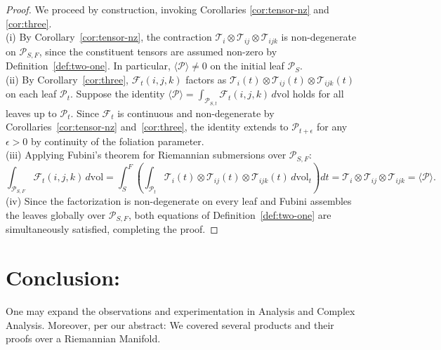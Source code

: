 \documentclass[10pt]{article}
\theoremstyle{plain}
\theoremstyle{definition}
\theoremstyle{remark}
\begin{document}
\begin{proof}
\label{proof:construc}
We proceed by construction, invoking Corollaries \ref{cor:tensor-nz} and \ref{cor:three}.\\
(i) By Corollary~\ref{cor:tensor-nz}, the contraction $\mathcal{T}_i \otimes \mathcal{T}_{ij} \otimes \mathcal{T}_{ijk}$ is non-degenerate on $\mathcal{P}_{S,F}$, since the constituent tensors are assumed non-zero by Definition~\ref{def:two-one}. In particular, $\langle \mathcal{P} \rangle \neq 0$ on the initial leaf $\mathcal{P}_S$.\\
(ii) By Corollary~\ref{cor:three}, $\mathcal{F}_t(i,j,k)$ factors as $\mathcal{T}_i(t) \otimes \mathcal{T}_{ij}(t) \otimes \mathcal{T}_{ijk}(t)$ on each leaf $\mathcal{P}_t$. Suppose the identity $\langle \mathcal{P} \rangle = \int_{\mathcal{P}_{S,t}} \mathcal{F}_t(i,j,k)\,d\mathrm{vol}$ holds for all leaves up to $\mathcal{P}_t$. Since $\mathcal{F}_t$ is continuous and non-degenerate by Corollaries~\ref{cor:tensor-nz} and~\ref{cor:three}, the identity extends to $\mathcal{P}_{t+\epsilon}$ for any $\epsilon > 0$ by continuity of the foliation parameter.\\
(iii) Applying Fubini's theorem for Riemannian submersions over $\mathcal{P}_{S,F}$:
\begin{equation}
  \int_{\mathcal{P}_{S,F}} \mathcal{F}_t(i,j,k)\,d\mathrm{vol}
  = \int_{S}^{F} \left(\int_{\mathcal{P}_t} \mathcal{T}_i(t) \otimes \mathcal{T}_{ij}(t) \otimes \mathcal{T}_{ijk}(t)\,d\mathrm{vol}_t\right) dt
  = \mathcal{T}_i \otimes \mathcal{T}_{ij} \otimes \mathcal{T}_{ijk}
  = \langle \mathcal{P} \rangle.
\end{equation}
(iv) Since the factorization is non-degenerate on every leaf and Fubini assembles the leaves globally over $\mathcal{P}_{S,F}$, both equations of Definition~\ref{def:two-one} are simultaneously satisfied, completing the proof.
\end{proof}

\section{Conclusion:}

One may expand the observations and experimentation in Analysis and Complex Analysis. Moreover, per our abstract: We covered several products and their proofs over a Riemannian Manifold.

\nocite{*}



\end{document}

